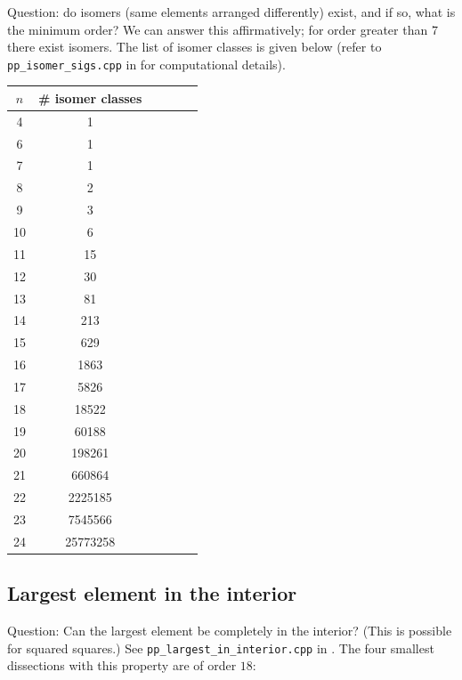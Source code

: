 \documentclass[12pt,amstags,fleqn]{article}
\theoremstyle{plain}
\theoremstyle{definition}
\begin{document}
Question: do isomers (same elements arranged differently)
exist, and if so, what is the minimum order? We can answer this affirmatively; for order greater than 7 there
exist isomers. The list of isomer classes is given below (refer to
\texttt{pp\_isomer\_sigs.cpp} in \cite{githubrepo} for computational
details).

\begin{center}
\begin{tabular}{|c|c|c|c|c|c|}
\hline $n$ & \# isomer classes \\
\hline
\hline 4  & 1               \\
\hline 6  & 1               \\
\hline 7  & 1               \\
\hline 8  & 2               \\
\hline 9  & 3               \\
\hline 10 & 6               \\
\hline 11 & 15              \\
\hline 12 & 30              \\
\hline 13 & 81              \\
\hline 14 & 213             \\
\hline 15 & 629             \\
\hline 16 & 1863            \\
\hline 17 & 5826            \\
\hline 18 & 18522           \\
\hline 19 & 60188           \\
\hline 20 & 198261          \\
\hline 21 & 660864          \\
\hline 22 & 2225185         \\
\hline 23 & 7545566         \\
\hline 24 & 25773258        \\
\hline
\end{tabular}
\end{center}

\subsection{Largest element in the interior}

Question: Can the largest element be completely in the interior? (This
is possible for squared squares.) 
See \texttt{pp\_largest\_in\_interior.cpp} in \cite{githubrepo}.
The four smallest dissections with this property are of order $18$:
\end{document}
